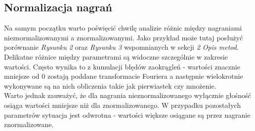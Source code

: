 \documentclass[a4paper]{article}
\begin{document}
\subsection{Normalizacja nagrań}
Na samym początku warto poświęcić chwilę analizie różnic między nagraniami nieznormalizowanymi a znormalizowanymi. Jako przykład może tutaj posłużyć porównanie \textit{Rysunku 2} oraz \textit{Rysunku 3} wspomnianych w sekcji \textit{2 Opis metod}. Delikatne różnice między parametrami są widoczne szczególnie w zakresie wartości. Często wynika to z kumulacji błędów zaokrągleń - wartości znacznie mniejsze od 0 zostają poddane transformacie Fouriera a następnie wielokrotnie wykonywane są na nich obliczenia takie jak pierwiastek czy mnożenie.\\
Warto jednak zauważyć, że dla nagrania nieznormalizowanego wyłącznie głośność osiąga wartości mniejsze niż dla znormalizowanego. W przypadku pozostałych parametrów sytuacja jest odwrotna - wartości większe osiągane są przez nagranie znormalizowane.
\end{document}
